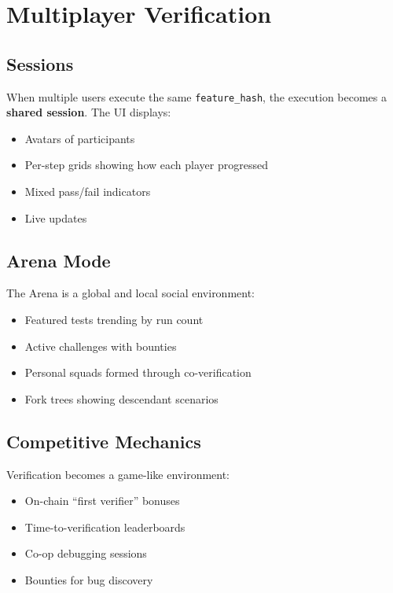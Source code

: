 \documentclass[12pt,a4paper]{article}
\begin{document}
\section{Multiplayer Verification}

\subsection{Sessions}

When multiple users execute the same \texttt{feature\_hash}, the execution becomes a \textbf{shared session}. The UI displays:

\begin{itemize}
    \item Avatars of participants
    \item Per-step grids showing how each player progressed
    \item Mixed pass/fail indicators
    \item Live updates
\end{itemize}

\subsection{Arena Mode}

The Arena is a global and local social environment:

\begin{itemize}
    \item Featured tests trending by run count
    \item Active challenges with bounties
    \item Personal squads formed through co-verification
    \item Fork trees showing descendant scenarios
\end{itemize}

\subsection{Competitive Mechanics}

Verification becomes a game-like environment:
\begin{itemize}
    \item On-chain “first verifier” bonuses
    \item Time-to-verification leaderboards
    \item Co-op debugging sessions
    \item Bounties for bug discovery
\end{itemize}
\end{document}
